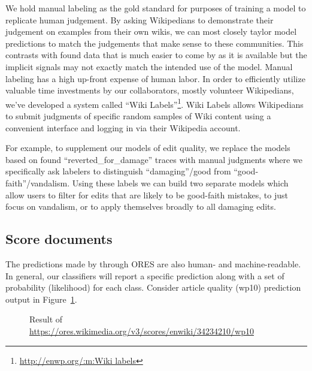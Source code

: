 %
We hold manual labeling as the gold standard for purposes of training a model to replicate human judgement.  By asking Wikipedians to demonstrate their judgement on examples from their own wikis, we can most closely taylor model predictions to match the judgements that make sense to these communities.  This contrasts with found data that is much easier to come by as it is available but the implicit signals may not exactly match the intended use of the model.  Manual labeling has a high up-front expense of human labor.  In order to efficiently utilize valuable time investments by our collaborators, mostly volunteer Wikipedians, we've developed a system called ``Wiki Labels''\footnote{\url{http://enwp.org/:m:Wiki labels}}.  Wiki Labels allows Wikipedians to submit judgments of specific random samples of Wiki content using a convenient interface and logging in via their Wikipedia account.

For example, to supplement our models of edit quality, we replace the models based on found ``reverted\_for\_damage'' traces with manual judgments where we specifically ask labelers to distinguish ``damaging''/good from ``good-faith''/vandalism.  Using these labels we can build two separate models which allow users to filter for edits that are likely to be good-faith mistakes\cite{halfaker2017automated}, to just focus on vandalism, or to apply themselves broadly to all damaging edits.


\subsection{Score documents}
The predictions made by through ORES are also human- and machine-readable.  In general, our classifiers will report a specific prediction along with a set of probability (likelihood) for each class.  Consider article quality (wp10) prediction output in Figure~\ref{fig:english_damaging_model_info}.

\begin{figure}[htbp]
        \caption{Result of \url{https://ores.wikimedia.org/v3/scores/enwiki/34234210/wp10}}
        \label{fig:english_damaging_model_info}
\end{figure}

